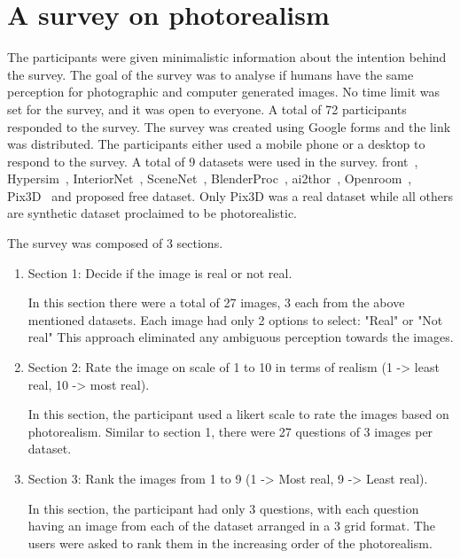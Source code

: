 \section{A survey on photorealism}\label{sec:a-survey-on-photorealism}
The participants were given minimalistic information about the intention behind the survey.
The goal of the survey was to analyse if humans have the same perception for photographic and computer generated images.
No time limit was set for the survey, and it was open to everyone.
A total of 72 participants responded to the survey.
The survey was created using Google forms and the link was distributed.
The participants either used a mobile phone or a desktop to respond to the survey.
A total of 9 datasets were used in the survey.
\gls{front}~\cite{Fu20203DFRONT3F}, Hypersim~\cite{Roberts2020HypersimAP}, InteriorNet~\cite{InteriorNet18}, SceneNet~\cite{McCormac:etal:ICCV2017}, BlenderProc~\cite{denninger2019blenderproc},
\gls{ai2thor}~\cite{kolve2019ai2thor}, Openroom~\cite{li2021openrooms}, Pix3D~\cite{pix3d} and proposed \gls{free} dataset.
Only Pix3D was a real dataset while all others are synthetic dataset proclaimed to be photorealistic.

The survey was composed of 3 sections.
\begin{enumerate}
    \item Section 1: Decide if the image is real or not real.

    In this section there were a total of 27 images, 3 each from the above mentioned datasets.
    Each image had only 2 options to select: "Real" or "Not real"
    This approach eliminated any ambiguous perception towards the images.

    \item Section 2: Rate the image on scale of 1 to 10 in terms of realism (1 -> least real, 10 -> most real).

    In this section, the participant used a likert scale to rate the images based on photorealism.
    Similar to section 1, there were 27 questions of 3 images per dataset.

    \item Section 3: Rank the images from 1 to 9 (1 -> Most real, 9 -> Least real).

    In this section, the participant had only 3 questions, with each question having an image from each of the dataset arranged in a 3 grid format.
    The users were asked to rank them in the increasing order of the photorealism.
\end{enumerate}

